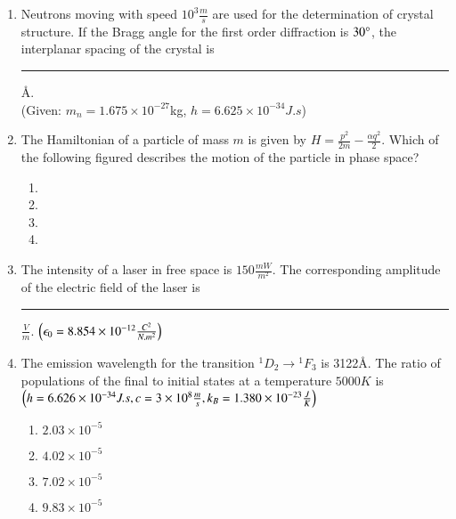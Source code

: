 \documentclass[journal]{IEEEtran}
\begin{document}
\begin{enumerate}
\setcounter{enumi}{0}

    \item Neutrons moving with speed $10^3\frac{m}{s}$ are used for the determination of crystal structure. If the Bragg angle for the first order diffraction is $30\degree$, the interplanar spacing of the crystal is \rule{1cm}{0.15mm} \AA.\\
    (Given: $m_n=1.675\times10^{-27}$kg, $h=6.625\times10^{-34}J.s$)

    \item The Hamiltonian of a particle of mass $m$ is given by $H=\frac{p^2}{2m}-\frac{\alpha q^2}{2}$. Which of the following figured describes the motion of the particle in phase space?

        \begin{multicols}{2}
            \begin{enumerate}
                \item 
                \item 
                \item 
                \item 
            \end{enumerate}
        \end{multicols}

    \item The intensity of a laser in free space is $150\frac{mW}{m^2}$. The corresponding amplitude of the electric field of the laser is \rule{1cm}{0.15mm}$\frac{V}{m}$. $\left(\epsilon_0=8.854\times10^{-12}\frac{C^2}{N.m^2}\right)$


    \item The emission wavelength for the transition $^1D_2\rightarrow {^1F_3}$ is 3122\AA. The ratio of populations of the final to initial states at a temperature $5000K$ is\\ $\left(h=6.626\times10^{-34}J.s, c=3\times10^8\frac{m}{s}, k_B=1.380\times10^{-23}\frac{J}{K}\right)$
    
	\begin{multicols}{4}
		\begin{enumerate}
                \item $2.03\times10^{-5}$
                \item $4.02\times10^{-5}$
                \item $7.02\times10^{-5}$
                \item $9.83\times10^{-5}$
			\end{enumerate}
		\end{multicols}


\end{enumerate}
\end{document}
